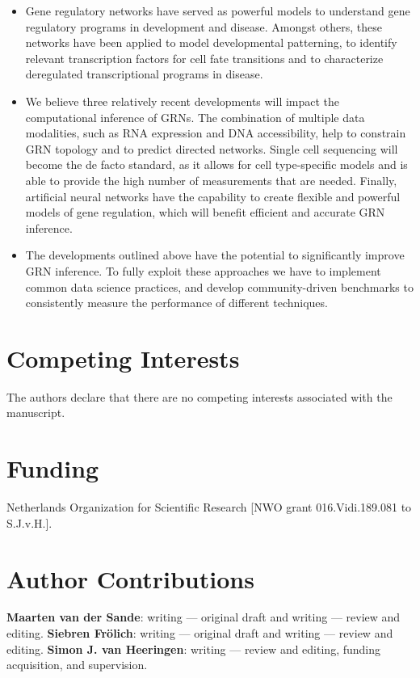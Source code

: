 \begin{itemize}
    \item Gene regulatory networks have served as powerful models to understand gene regulatory programs in development and disease. Amongst others, these networks have been applied to model developmental patterning, to identify relevant transcription factors for cell fate transitions and to characterize deregulated transcriptional programs in disease.
    \item We believe three relatively recent developments will impact the computational inference of GRNs. The combination of multiple data modalities, such as RNA expression and DNA accessibility, help to constrain GRN topology and to predict directed networks. Single cell sequencing will become the de facto standard, as it allows for cell type-specific models and is able to provide the high number of measurements that are needed. Finally, artificial neural networks have the capability to create flexible and powerful models of gene regulation, which will benefit efficient and accurate GRN inference.
    \item The developments outlined above have the potential to significantly improve GRN inference. To fully exploit these approaches we have to implement common data science practices, and develop community-driven benchmarks to consistently measure the performance of different techniques.
\end{itemize}

\section{Competing Interests}

The authors declare that there are no competing interests associated with the manuscript.

\section{Funding}

Netherlands Organization for Scientific Research [NWO grant 016.Vidi.189.081 to S.J.v.H.].

\section{Author Contributions}

\textbf{Maarten van der Sande}: writing — original draft and writing — review and editing. \textbf{Siebren Fr{\"o}lich}: writing — original draft and writing — review and editing. \textbf{Simon J. van Heeringen}: writing — review and editing, funding acquisition, and supervision.

